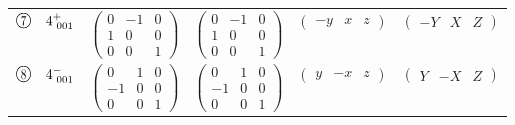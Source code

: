 \documentclass[fleqn,10pt,landscape]{jsarticle}
\begin{document}
\begin{center}
\begin{longtable}{lcccc}
$ {\ooalign{\hfil\resizebox{.8\width}{\height}{7}\hfil\crcr\raise.1ex\hbox{\large$\bigcirc$}}}\quad 4^{+}_{\,\,001} $ & $ \begin{pmatrix} 0 & -1 & 0 \\ 1 & 0 & 0 \\ 0 & 0 & 1 \end{pmatrix} $ & $ \begin{pmatrix} 0 & -1 & 0 \\ 1 & 0 & 0 \\ 0 & 0 & 1 \end{pmatrix} $ & $ \begin{pmatrix} - y & x & z \end{pmatrix} $ & $ \begin{pmatrix} - Y & X & Z \end{pmatrix} $ \\
$ {\ooalign{\hfil\resizebox{.8\width}{\height}{8}\hfil\crcr\raise.1ex\hbox{\large$\bigcirc$}}}\quad 4^{-}_{\,\,001} $ & $ \begin{pmatrix} 0 & 1 & 0 \\ -1 & 0 & 0 \\ 0 & 0 & 1 \end{pmatrix} $ & $ \begin{pmatrix} 0 & 1 & 0 \\ -1 & 0 & 0 \\ 0 & 0 & 1 \end{pmatrix} $ & $ \begin{pmatrix} y & - x & z \end{pmatrix} $ & $ \begin{pmatrix} Y & - X & Z \end{pmatrix} $ \\
\end{longtable}
\end{center}
\newpage
\end{document}
